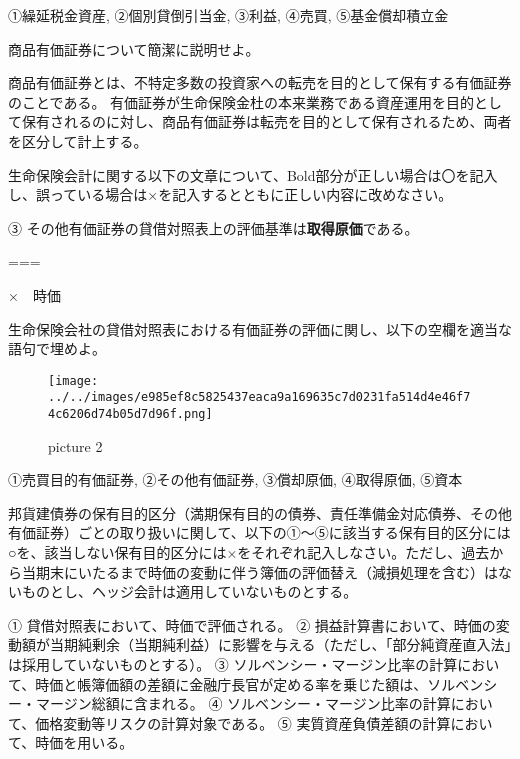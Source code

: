 \documentclass[report,gutter=10mm,fore-edge=10mm,uplatex,dvipdfmx]{jlreq}
\begin{document}

①繰延税金資産, ②個別貸倒引当金, ③利益, ④売買, ⑤基金償却積立金



商品有価証券について簡潔に説明せよ。


商品有価証券とは、不特定多数の投資家への転売を目的として保有する有価証券のことである。
有価証券が生命保険金杜の本来業務である資産運用を目的として保有されるのに対し、商品有価証券は転売を目的として保有されるため、両者を区分して計上する。


生命保険会計に関する以下の文章について、Bold部分が正しい場合は〇を記入し、誤っている場合は×を記入するとともに正しい内容に改めなさい。

③ その他有価証券の貸借対照表上の評価基準は\textbf{取得原価}である。

===


×　時価


生命保険会社の貸借対照表における有価証券の評価に関し、以下の空欄を適当な語句で埋めよ。

\begin{figure}
\centering
\texttt{[image: ../../images/e985ef8c5825437eaca9a169635c7d0231fa514d4e46f74c6206d74b05d7d96f.png]}
\caption{picture 2}
\end{figure}


①売買目的有価証券, ②その他有価証券, ③償却原価, ④取得原価, ⑤資本



邦貨建債券の保有目的区分（満期保有目的の債券、責任準備金対応債券、その他有価証券）ごとの取り扱いに関して、以下の①～⑤に該当する保有目的区分には○を、該当しない保有目的区分には×をそれぞれ記入しなさい。ただし、過去から当期末にいたるまで時価の変動に伴う簿価の評価替え（減損処理を含む）はないものとし、ヘッジ会計は適用していないものとする。

① 貸借対照表において、時価で評価される。 ②
損益計算書において、時価の変動額が当期純剰余（当期純利益）に影響を与える（ただし、「部分純資産直入法」は採用していないものとする）。
③
ソルベンシー・マージン比率の計算において、時価と帳簿価額の差額に金融庁長官が定める率を乗じた額は、ソルベンシー・マージン総額に含まれる。
④
ソルベンシー・マージン比率の計算において、価格変動等リスクの計算対象である。
⑤ 実質資産負債差額の計算において、時価を用いる。
\end{document}
